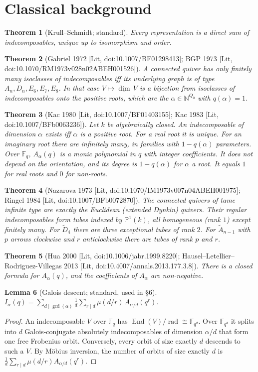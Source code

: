 \documentclass[11pt]{article}
\newtheorem{theorem}{Theorem}\newtheorem{proposition}[theorem]{Proposition}\newtheorem{corollary}[theorem]{Corollary}
\newtheorem{lemma}[theorem]{Lemma}
\theoremstyle{definition}\newtheorem{definition}[theorem]{Definition}\newtheorem{remark}[theorem]{Remark}\newtheorem{observation}[theorem]{Numerical observation}
\begin{document}
\section{Classical background}
\begin{theorem}[Krull--Schmidt; standard]
Every representation is a direct sum of indecomposables, unique up to isomorphism and order.
\end{theorem}
\begin{theorem}[Gabriel 1972 {[Lit, doi:10.1007/BF01298413]}; BGP 1973 {[Lit, doi:10.1070/RM1973v028n02ABEH001526]}]
A connected quiver has only finitely many isoclasses of indecomposables iff its underlying graph is of type $A_n,D_n,E_6,E_7,E_8$.
In that case $V\mapsto\underline{\dim}\,V$ is a bijection from isoclasses of indecomposables onto the positive roots, which are the
$\alpha\in\mathbb N^{Q_0}$ with $q(\alpha)=1$.
\end{theorem}
\begin{theorem}[Kac 1980 {[Lit, doi:10.1007/BF01403155]}; Kac 1983 {[Lit, doi:10.1007/BFb0063236]}]
Let $k$ be algebraically closed. An indecomposable of dimension $\alpha$ exists iff $\alpha$ is a positive root. For a real root it is unique.
For an imaginary root there are infinitely many, in families with $1-q(\alpha)$ parameters. Over $\mathbb F_q$, $A_\alpha(q)$ is a monic polynomial in $q$
with integer coefficients. It does not depend on the orientation, and its degree is $1-q(\alpha)$ for $\alpha$ a root. It equals $1$ for real roots and $0$ for non-roots.
\end{theorem}
\begin{theorem}[Nazarova 1973 {[Lit, doi:10.1070/IM1973v007n04ABEH001975]}; Ringel 1984 {[Lit, doi:10.1007/BFb0072870]}]
The connected quivers of tame infinite type are exactly the Euclidean (extended Dynkin) quivers. Their regular indecomposables form tubes
indexed by $\mathbb P^1(k)$, all homogeneous (rank $1$) except finitely many. For $\widetilde D_4$ there are three exceptional tubes of rank $2$.
For $\widetilde A_{n-1}$ with $p$ arrows clockwise and $r$ anticlockwise there are tubes of rank $p$ and $r$.
\end{theorem}
\begin{theorem}[Hua 2000 {[Lit, doi:10.1006/jabr.1999.8220]}; Hausel--Letellier--Rodriguez-Villegas 2013 {[Lit, doi:10.4007/annals.2013.177.3.8]}]
There is a closed formula for $A_\alpha(q)$, and the coefficients of $A_\alpha$ are non-negative.
\end{theorem}
\begin{lemma}[Galois descent; standard, used in \S6]
$I_\alpha(q)=\sum_{d\mid\gcd(\alpha)}\frac1d\sum_{r\mid d}\mu(d/r)\,A_{\alpha/d}(q^r)$.
\end{lemma}
\begin{proof}
An indecomposable $V$ over $\mathbb F_q$ has $\operatorname{End}(V)/\operatorname{rad}\cong\mathbb F_{q^d}$. Over $\mathbb F_{q^d}$ it splits into
$d$ Galois-conjugate absolutely indecomposables of dimension $\alpha/d$ that form one free Frobenius orbit. Conversely, every orbit of size exactly $d$
descends to such a $V$. By M\"obius inversion, the number of orbits of size exactly $d$ is $\frac1d\sum_{r\mid d}\mu(d/r)A_{\alpha/d}(q^r)$.
\end{proof}
\end{document}
